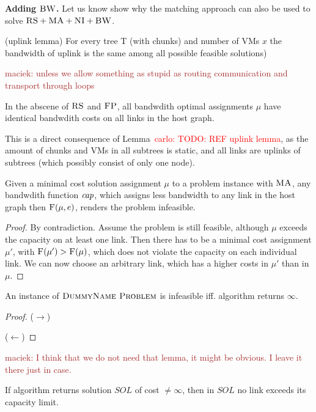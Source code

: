 \documentclass[9pt,twocolumn]{scrartcl}
\newcommand{\Problem}{\textsc{DummyName Problem}}
\newcommand{\carlo}[1]{\textcolor{red}{carlo: #1}}
\newcommand{\maciek}[1]{\textcolor{brown}{maciek: #1}}
\newcommand{\VmChunkAssignment}{\mu}
\newcommand{\SubstrateEdge}{\ensuremath{e}}
\newcommand{\capacity}{\emph{cap}}
\newcommand{\CC}{\textsc{NI}}
\newcommand{\FP}{\textsc{FP}}
\newcommand{\RS}{\textsc{RS}}
\newcommand{\BW}{\textsc{BW}}
\newcommand{\MA}{\textsc{MA}}
\newcommand{\Cost}{\textsc{F}}
\newcommand{\Sol}{\ensuremath{SOL}}
\begin{document}
\textbf{Adding $\BW$.} Let us know show why the matching approach can also be used to solve $\RS+\MA+\CC+\BW$.

\begin{lemma}
(uplink lemma)
For every tree T (with chunks) and number of VMs $x$ the bandwidth of uplink is the same among all possible feasible solutions)

\maciek{unless we allow something as stupid as routing communication and transport through loops}
\end{lemma}


\begin{corollary}
In the abscene of $\RS$ and $\FP$, all bandwdith optimal assignments
$\VmChunkAssignment$ have identical bandwdith costs on all links in the host
graph.
\end{corollary}

This is a direct consequence of Lemma~\carlo{TODO: REF uplink lemma}, as the
amount of chunks and VMs in all subtrees is static, and all links are uplinks
of subtrees (which possibly consist of only one node).

\begin{lemma}
Given a minimal cost solution assignment $\VmChunkAssignment$ to a problem
instance with $\MA$, any bandwdith function $\capacity$, which assigns less
bandwidth to any link in the host graph then $\Cost(\VmChunkAssignment,
\SubstrateEdge)$, renders the problem infeasible.
\end{lemma}

\begin{proof}
 By contradiction. Assume the problem is still feasible, although
$\VmChunkAssignment$ exceeds the capacity on at least one link. Then there has
to be a minimal cost assignment $\VmChunkAssignment'$, with
$\Cost(\VmChunkAssignment') > \Cost(\VmChunkAssignment)$, which does not
violate the capacity on each individual link. We can now choose an arbitrary
link, which has a higher costs in $\VmChunkAssignment'$ than in
$\VmChunkAssignment$.
\end{proof}

\begin{lemma}
An instance of $\Problem$ is infeasible iff. algorithm returns $\infty$.
\end{lemma}
\begin{proof}
  ($\rightarrow$)

  ($\leftarrow$)
  \end{proof}

\maciek{I think that we do not need that lemma, it might be obvious. I leave it
there just in case.}
\begin{lemma}
  If algorithm returns solution $\Sol$ of cost $\neq \infty$, then in $\Sol$ no
link exceeds its capacity limit.
  \end{lemma}
\end{document}

